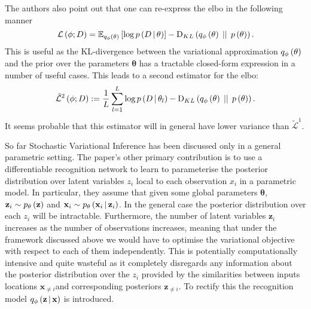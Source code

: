 \documentclass[../report.tex]{subfiles}
\begin{document}

The authors also point out that one can re-express the elbo in the following manner
\begin{equation}
  \mathcal{L} \left( \phi; D\right) = \mathbb{E}_{q_\phi \left( \mathbf{\theta}\right)} \left[ \log p \left(D \, \middle\vert \, \mathbf{\theta} \right) \right] - \textrm{D}_{KL} \left( q_\phi \left( \mathbf{\theta}\right) \, \mid \mid \, p \left( \mathbf{\theta}\right)\right).
\end{equation}
This is useful as the KL-divergence between the variational approximation $q_\phi \left( \mathbf{\theta}\right)$ and the prior over the parameters $\mathbf{\theta}$ has a tractable closed-form expression in a number of useful cases. This leads to a second estimator for the elbo:
\begin{equation}
  \tilde{\mathcal{L}}^2 \left( \phi; D\right) := \frac{1}{L} \sum_{l=1}^{L} \log p \left(D \, \middle\vert \, \mathbf{\theta}_l \right) - \textrm{D}_{KL} \left( q_\phi \left( \mathbf{\theta}\right) \, \mid \mid \, p \left( \mathbf{\theta}\right)\right).
\end{equation}
It seems probable that this estimator will in general have lower variance than $\tilde{\mathcal{L}}^1$.

So far Stochastic Variational Inference has been discussed only in a general parametric setting. The paper's other primary contribution is to use a differentiable recognition network to learn to parameterise the posterior distribution over latent variables $z_i$ local to each observation $x_i$ in a parametric model. In particular, they assume that given some global parameters $\mathbf{\theta}$, $\mathbf{z}_i \sim p_\mathbf{\theta} \left( \mathbf{z}\right)$ and $\mathbf{x}_i \sim p_\mathbf{\theta} \left(\mathbf{x}_i \, \middle\vert \, \mathbf{z}_i \right)$. In the general case the posterior distribution over each $z_i$ will be intractable. Furthermore, the number of latent variables $\mathbf{z}_i$ increases as the number of observations increases, meaning that under the framework discussed above we would have to optimise the variational objective with respect to each of them independently. This is potentially computationally intensive and quite wasteful as it completely disregards any information about the posterior distribution over the $z_i$ provided by the similarities between inputs locations $\mathbf{x}_{\neq i}$and corresponding posteriors $\mathbf{z}_{\neq i}$. To rectify this the recognition model $q_\phi \left(\mathbf{z} \, \middle\vert \, \mathbf{x} \right)$ is introduced.
\end{document}

